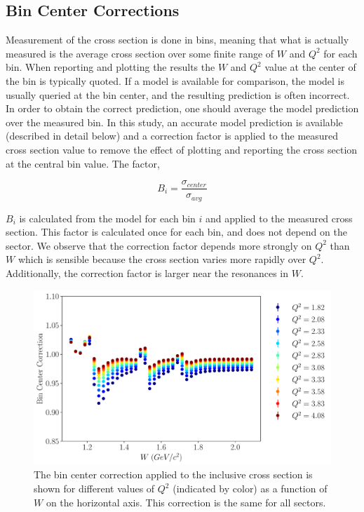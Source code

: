 \subsection{Bin Center Corrections}
Measurement of the cross section is done in bins, meaning that what is actually measured is the average cross section over some finite range of $W$ and $Q^2$ for each bin.  When reporting and plotting the results the $W$ and $Q^2$ value at the center of the bin is typically quoted.  If a model is available for comparison, the model is usually queried at the bin center, and the resulting prediction is often incorrect.  In order to obtain the correct prediction, one should average the model prediction over the measured bin.  In this study, an accurate model prediction is available (described in detail below) and a correction factor is applied to the measured cross section value to remove the effect of plotting and reporting the cross section at the central bin value.  The factor, 

\begin{equation}
	B_{i} = \frac{\sigma_{center}}{\sigma_{avg}}
\end{equation}

$B_i$ is calculated from the model for each bin $i$ and applied to the measured cross section.  This factor is calculated once for each bin, and does not depend on the sector.  We observe that the correction factor depends more strongly on $Q^2$ than $W$ which is sensible because the cross section varies more rapidly over $Q^2$.  Additionally, the correction factor is larger near the resonances in $W$.

\begin{figure}
	\centering
	\label{fig-bin-centering-correction} 
	\includegraphics[width=14cm]{image/plots/inclusive/bin_center_correction.pdf}
	\caption{The bin center correction applied to the inclusive cross section is shown for different values of $Q^2$ (indicated by color) as a function of $W$ on the horizontal axis.   This correction is the same for all sectors.}
\end{figure}

